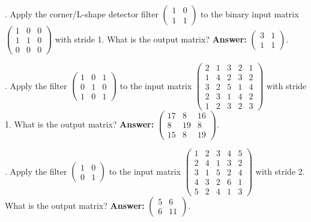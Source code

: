 \bigskip

\noindent
{\bf \theCNNCounter}. Apply the corner/L-shape detector filter $\begin{pmatrix} 1 & 0 \\ 1 & 1 \end{pmatrix}$ to the binary input matrix $\begin{pmatrix} 1 & 0 & 0 \\ 1 & 1 & 0 \\ 0 & 0 & 0 \end{pmatrix}$ with stride 1. What is the output matrix? {\bf Answer:} $\begin{pmatrix} 3 & 1 \\ 1 & 1 \end{pmatrix}$.

\bigskip

\noindent
{\bf \theCNNCounter}. Apply the filter $\begin{pmatrix} 1 & 0 & 1 \\ 0 & 1 & 0 \\ 1 & 0 & 1 \end{pmatrix}$ to the input matrix $\begin{pmatrix} 2 & 1 & 3 & 2 & 1 \\ 1 & 4 & 2 & 3 & 2 \\ 3 & 2 & 5 & 1 & 4 \\ 2 & 3 & 1 & 4 & 2 \\ 1 & 2 & 3 & 2 & 3 \end{pmatrix}$ with stride 1. What is the output matrix? {\bf Answer:} $\begin{pmatrix} 17 & 8 & 16 \\ 8 & 19 & 8 \\ 15 & 8 & 19 \end{pmatrix}$.

\bigskip

\noindent
{\bf \theCNNCounter}. Apply the filter $\begin{pmatrix} 1 & 0 \\ 0 & 1 \end{pmatrix}$ to the input matrix $\begin{pmatrix} 1 & 2 & 3 & 4 & 5 \\ 2 & 4 & 1 & 3 & 2 \\ 3 & 1 & 5 & 2 & 4 \\ 4 & 3 & 2 & 6 & 1 \\ 5 & 2 & 4 & 1 & 3 \end{pmatrix}$ with stride 2. What is the output matrix? {\bf Answer:} $\begin{pmatrix} 5 & 6 \\ 6 & 11 \end{pmatrix}$.


